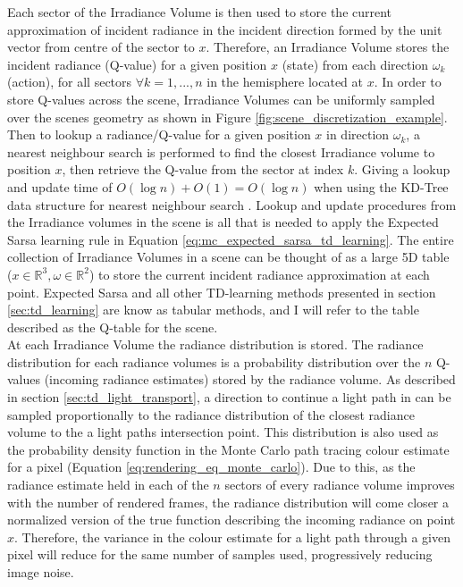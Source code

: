 \documentclass[../dissertation.tex]{subfiles}
\begin{document}
Each sector of the Irradiance Volume is then used to store the current approximation of incident radiance in the incident direction formed by the unit vector from centre of the sector to $x$. Therefore, an Irradiance Volume stores the incident radiance (Q-value) for a given position $x$ (state) from each direction $\omega_k$ (action), for all sectors $\forall k = 1,...,n$ in the hemisphere located at $x$. In order to store Q-values across the scene, Irradiance Volumes can be uniformly sampled over the scenes geometry as shown in Figure \ref{fig:scene_discretization_example}. Then to lookup a radiance/Q-value for a given position $x$ in direction $\omega_k$, a nearest neighbour search is performed to find the closest Irradiance volume to position $x$, then retrieve the Q-value from the sector at index $k$. Giving a lookup and update time of $O(\log n) + O(1) = O(\log n)$ when using the KD-Tree data structure for nearest neighbour search \cite{bentley1975multidimensional}.  Lookup and update procedures from the Irradiance volumes in the scene is all that is needed to apply the Expected Sarsa learning rule in Equation \ref{eq:mc_expected_sarsa_td_learning}. The entire collection of Irradiance Volumes in a scene can be thought of as a large 5D table ($x \in \mathbb{R}^3, \omega \in \mathbb{R}^2$) to store the current incident radiance approximation at each point. Expected Sarsa and all other TD-learning methods presented in section \ref{sec:td_learning} are know as tabular methods, and I will refer to the table described as the Q-table for the scene.\\


At each Irradiance Volume the radiance distribution is stored. The radiance distribution for each radiance volumes is a probability distribution over the $n$ Q-values (incoming radiance estimates) stored by the radiance volume. As described in section \ref{sec:td_light_transport}, a direction to continue a light path in can be sampled proportionally to the radiance distribution of the closest radiance volume to the a light paths intersection point. This distribution is also used as the probability density function in the Monte Carlo path tracing colour estimate for a pixel (Equation \ref{eq:rendering_eq_monte_carlo}). Due to this, as the radiance estimate held in each of the $n$ sectors of every radiance volume improves with the number of rendered frames, the radiance distribution will come closer a normalized version of the true function describing the incoming radiance on point $x$. Therefore, the variance in the colour estimate for a light path through a given pixel will reduce for the same number of samples used, progressively reducing image noise.
\end{document}
